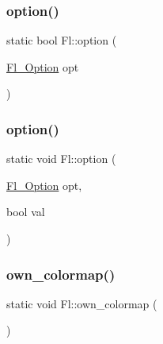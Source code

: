 \subsubsection{\texorpdfstring{option()}{option()}\hspace{0.1cm}{\footnotesize\ttfamily [1/2]}}
{\footnotesize\ttfamily static bool Fl\+::option (\begin{DoxyParamCaption}\item[{\hyperlink{class_fl_a43e6e0bbbc03cad134d928d4edd48d1d}{Fl\+\_\+\+Option}}]{opt }\end{DoxyParamCaption})\hspace{0.3cm}{\ttfamily [static]}}

\mbox{\label{class_fl_a3d05604368612a03f1a91d440f34ed11}} 
\subsubsection{\texorpdfstring{option()}{option()}\hspace{0.1cm}{\footnotesize\ttfamily [2/2]}}
{\footnotesize\ttfamily static void Fl\+::option (\begin{DoxyParamCaption}\item[{\hyperlink{class_fl_a43e6e0bbbc03cad134d928d4edd48d1d}{Fl\+\_\+\+Option}}]{opt,  }\item[{bool}]{val }\end{DoxyParamCaption})\hspace{0.3cm}{\ttfamily [static]}}

\mbox{\label{class_fl_a590d296ea8bf670bde2b2532b7656766}} 
\subsubsection{\texorpdfstring{own\+\_\+colormap()}{own\_colormap()}}
{\footnotesize\ttfamily static void Fl\+::own\+\_\+colormap (\begin{DoxyParamCaption}{ }\end{DoxyParamCaption})\hspace{0.3cm}{\ttfamily [static]}}

\mbox{\label{class_fl_a813faf81f334dcb9436106aaf2cc66d8}} 
